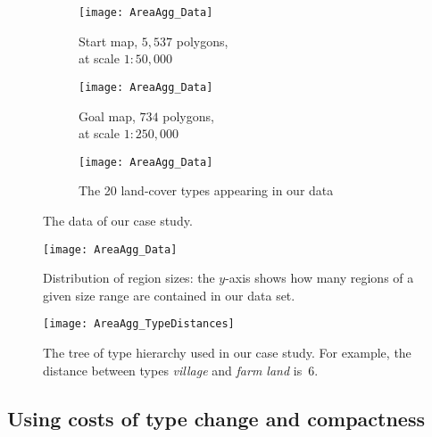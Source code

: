 \begin{figure}[tb]
\captionsetup[subfigure]{labelformat=empty}
\begin{subfigure}[b]{.49\textwidth}
	\centering
	\texttt{[image: AreaAgg\_Data]}
	\caption{Start map, $5{,}537$ polygons, \\
		at scale $1:50{,}000$}
\end{subfigure}
\hfill
\begin{subfigure}[b]{.49\textwidth}
	\centering
	\texttt{[image: AreaAgg\_Data]}
	\caption{Goal map, $734$ polygons, \\
		at scale $1:250{,}000$}
\end{subfigure}
%
\par\vspace{\baselineskip} %
%
\begin{subfigure}{\textwidth}
	\centering
	\texttt{[image: AreaAgg\_Data]}
	\caption{The 20 land-cover types appearing in our data}
\end{subfigure}
\caption{The data of our case study.}
\label{fig:AreaAgg_Data}
\end{figure}

\begin{figure}[tb]
\centering
\texttt{[image: AreaAgg\_Data]}
\caption{Distribution of region sizes:
	the $y$-axis shows how many regions 
	of a given size range are contained in our data set.}
\label{fig:AreaAgg_NumRegion}
\end{figure}

\begin{figure}[tb]
\centering
\texttt{[image: AreaAgg\_TypeDistances]}
\caption{The tree of type hierarchy used in our case study.
	For example, the distance between 
	types \emph{village} and \emph{farm land} is~$6$.}
\label{fig:AreaAgg_TypeDistances}
\end{figure}

\subsection{Using costs of type change and compactness}
\label{sec:AreaAgg_CaseStudy1}

